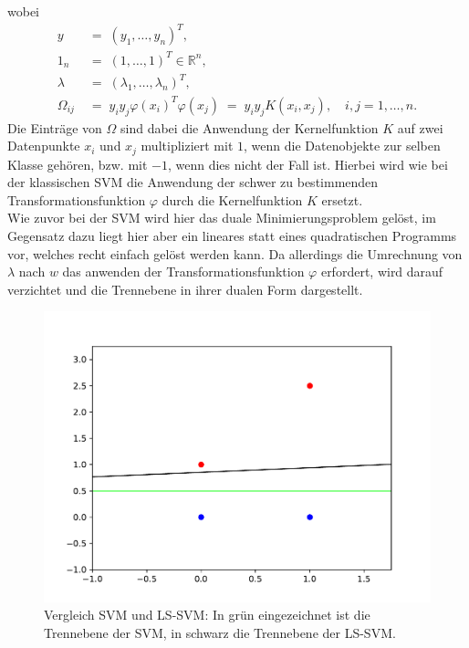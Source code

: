 wobei
\begin{align*}
	y &\;=\;(y_1,\dots,y_n)^T,\\
	1_n &\;=\;(1,\dots,1)^T\in\mathbb{R}^n,\\
	\lambda &\;=\;(\lambda_1,\dots,\lambda_n)^T,\\
	\Omega_{ij} &\;=\;y_iy_j\varphi(x_i)^T\varphi(x_j)\;=\;y_iy_jK(x_i,x_j), \quad i,j=1,\dots,n.
\end{align*}
Die Einträge von \(\Omega\) sind dabei die Anwendung der Kernelfunktion \(K\) auf zwei Datenpunkte \(x_i\) und \(x_j\) multipliziert mit \(1\), wenn die Datenobjekte zur selben Klasse gehören, bzw. mit \(-1\), wenn dies nicht der Fall ist. Hierbei wird wie bei der klassischen SVM die Anwendung der schwer zu bestimmenden Transformationsfunktion \(\varphi\) durch die  Kernelfunktion \(K\) ersetzt.\\
Wie zuvor bei der SVM wird hier das duale Minimierungsproblem gelöst, im Gegensatz dazu liegt hier aber ein lineares statt eines quadratischen Programms vor, welches recht einfach gelöst werden kann. Da allerdings die Umrechnung von \(\lambda\) nach \(w\) das anwenden der Transformationsfunktion \(\varphi\) erfordert, wird darauf verzichtet und die Trennebene in ihrer dualen Form dargestellt.\vspace*{-0,3cm}
\begin{figure}[h]
	\begin{center}	
	\includegraphics[scale=0.6]{SVMS.pdf}
	\end{center}
	\caption{Vergleich SVM und LS-SVM: In grün eingezeichnet ist die Trennebene der SVM, in schwarz die Trennebene der LS-SVM.}
	\label{fig:SVMS}
\end{figure}

